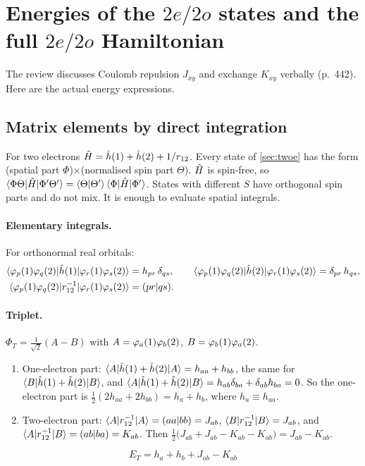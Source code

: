 \section{Energies of the $2e/2o$ states and the full $2e/2o$ Hamiltonian}\label{sec:energies}

The review discusses Coulomb repulsion $J_{xy}$ and exchange $K_{xy}$ verbally (p.~442). Here are the
actual energy expressions.

\subsection{Matrix elements by direct integration}
For two electrons $\hat H=\hat h(1)+\hat h(2)+1/r_{12}$. Every state of \cref{sec:twoe} has the form
(spatial part $\Phi$)$\times$(normalised spin part $\Theta$). $\hat H$ is spin-free, so
$\langle \Phi\Theta\vert \hat H\vert \Phi'\Theta'\rangle=\langle \Theta\vert \Theta'\rangle\,\langle \Phi\vert \hat H\vert \Phi'\rangle$. States with
different $S$ have orthogonal spin parts and do not mix. It is enough to evaluate spatial integrals.

\paragraph{Elementary integrals.} For orthonormal real orbitals:
\begin{align}
  \langle \varphi_p(1)\varphi_q(2)\vert \hat h(1)\vert \varphi_r(1)\varphi_s(2)\rangle&=h_{pr}\,\delta_{qs},\qquad
  \langle \varphi_p(1)\varphi_q(2)\vert \hat h(2)\vert \varphi_r(1)\varphi_s(2)\rangle=\delta_{pr}\,h_{qs},\label{eq:oneint}\\
  \langle \varphi_p(1)\varphi_q(2)\vert r_{12}^{-1}\vert \varphi_r(1)\varphi_s(2)\rangle&=(pr\vert qs) .\label{eq:twoint}
\end{align}

\paragraph{Triplet.} $\Phi_T=\tfrac1{\sqrt2}(A-B)$ with $A=\varphi_a(1)\varphi_b(2)$, $B=\varphi_b(1)\varphi_a(2)$.
\begin{enumerate}
  \item One-electron part: $\langle A\vert \hat h(1)+\hat h(2)\vert A\rangle=h_{aa}+h_{bb}$, the same for $\langle B\vert \hat h(1)+\hat h(2)\vert B\rangle$, and
        $\langle A\vert \hat h(1)+\hat h(2)\vert B\rangle=h_{ab}\delta_{ba}+\delta_{ab}h_{ba}=0$. So the one-electron part
        is $\tfrac12(2h_{aa}+2h_{bb})=h_a+h_b$, where $h_a\equiv h_{aa}$.
  \item Two-electron part: $\langle A\vert r_{12}^{-1}\vert A\rangle=(aa\vert bb)=J_{ab}$, $\langle B\vert r_{12}^{-1}\vert B\rangle=J_{ab}$, and
        $\langle A\vert r_{12}^{-1}\vert B\rangle=(ab\vert ba)=K_{ab}$. Then
        $\tfrac12\bigl(J_{ab}+J_{ab}-K_{ab}-K_{ab}\bigr)=J_{ab}-K_{ab}$.
\end{enumerate}
\begin{equation}\label{eq:ET}
  \boxed{E_T=h_a+h_b+J_{ab}-K_{ab}}
\end{equation}

